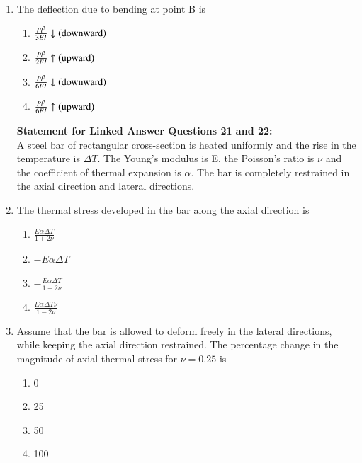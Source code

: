 \documentclass[a4paper,10pt]{article}
\begin{document}
\begin{enumerate}
\item The deflection due to bending at point B is
\hfill{}

\begin{multicols}{2}
\begin{enumerate}
\item $\frac{Pl^3}{3EI} \downarrow \left(\text{downward}\right)$
\item $\frac{Pl^3}{2EI} \uparrow \left(\text{upward}\right)$
\item $\frac{Pl^3}{6EI} \downarrow \left(\text{downward}\right)$
\item $\frac{Pl^3}{6EI} \uparrow \left(\text{upward}\right)$
\end{enumerate}
\end{multicols}

\textbf{Statement for Linked Answer Questions 21 and 22:} \\
A steel bar of rectangular cross-section is heated uniformly and the rise in the temperature is $\Delta T$. The Young's modulus is E, the Poisson's ratio is $\nu$ and the coefficient of thermal expansion is $\alpha$. The bar is completely restrained in the axial direction and lateral directions.

\item The thermal stress developed in the bar along the axial direction is
\hfill{}

\begin{multicols}{2}
\begin{enumerate}
\item $\frac{E\alpha\Delta T}{1+2\nu}$
\item $-E\alpha\Delta T$
\item $-\frac{E\alpha\Delta T}{1-2\nu}$
\item $\frac{E\alpha\Delta T \nu}{1-2\nu}$
\end{enumerate}
\end{multicols}

\item Assume that the bar is allowed to deform freely in the lateral directions, while keeping the axial direction restrained. The percentage change in the magnitude of axial thermal stress for $\nu = 0.25$ is
\hfill{}

\begin{multicols}{4}
\begin{enumerate}
\item 0
\item 25
\item 50
\item 100
\end{enumerate}
\end{multicols}
\end{enumerate}
\end{document}
